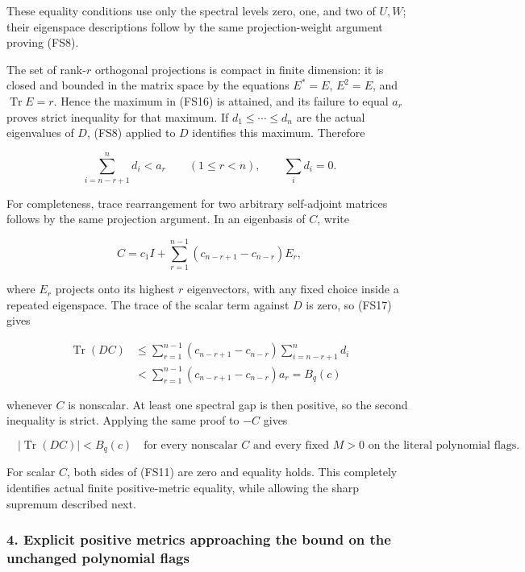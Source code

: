 \documentclass{article}
\begin{document}
These equality conditions use only the spectral levels zero, one, and two of \(U,W\); their eigenspace descriptions follow by the same projection-weight argument proving (FS8).

The set of rank-\(r\) orthogonal projections is compact in finite dimension: it is closed and bounded in the matrix space by the equations \(E^*=E\), \(E^2=E\), and \(\operatorname{Tr}E=r\). Hence the maximum in (FS16) is attained, and its failure to equal \(a_r\) proves strict inequality for that maximum. If \(d_1\le\cdots\le d_n\) are the actual eigenvalues of \(D\), (FS8) applied to \(D\) identifies this maximum. Therefore

\[
\sum_{i=n-r+1}^n d_i<a_r
\qquad(1\le r<n),\qquad \sum_i d_i=0.
\tag{FS17}
\]

For completeness, trace rearrangement for two arbitrary self-adjoint matrices follows by the same projection argument. In an eigenbasis of \(C\), write

\[
C=c_1I+\sum_{r=1}^{n-1}(c_{n-r+1}-c_{n-r})E_r,
\]

where \(E_r\) projects onto its highest \(r\) eigenvectors, with any fixed choice inside a repeated eigenspace. The trace of the scalar term against \(D\) is zero, so (FS17) gives

\[
\begin{aligned}
\operatorname{Tr}(DC)
&\le\sum_{r=1}^{n-1}(c_{n-r+1}-c_{n-r})
       \sum_{i=n-r+1}^n d_i\\
&<\sum_{r=1}^{n-1}(c_{n-r+1}-c_{n-r})a_r
=B_q(c)
\end{aligned}
\tag{FS18}
\]

whenever \(C\) is nonscalar. At least one spectral gap is then positive, so the second inequality is strict. Applying the same proof to \(-C\) gives

\[
\boxed{\quad |\operatorname{Tr}(DC)|<B_q(c)
\quad\text{for every nonscalar }C\text{ and every fixed }M>0
\text{ on the literal polynomial flags}.\quad}
\tag{FS19}
\]

For scalar \(C\), both sides of (FS11) are zero and equality holds. This completely identifies actual finite positive-metric equality, while allowing the sharp supremum described next.

\subsubsection{4. Explicit positive metrics approaching the bound on the unchanged polynomial flags}\label{endpoint-four_window_sharpness--explicit-positive-metrics-approaching-the-bound-on-the-unchanged-polynomial-flags}
\end{document}

